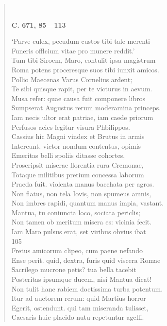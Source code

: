 \documentclass[11pt, a4paper]{report}
\begin{document}
\begin{verse}
        ﻿\pagebreak 
     \marginpar{[144]} \begin{center} \textbf{C. 671, 85—113} \end{center}‘Parve culex, pecudum custos tibi tale merenti \\ Funeris offlcium vitae pro munere reddit.’ \\ Tum tibi Siroem, Maro, contulit ipsa magistrum \\ Roma potens proceresque suos tibi iunxit amicos. \\ Pollio Maecenas Varus Cornelius ardent; \\ Te sibi quisque rapit, per te victurus in aevum. \\ Musa refer: quae causa fuit componere libros \\ Sumpserat Augustus rerum moderamina princeps. \\ Iam necis ultor erat patriae, iam caede priorum \\ Perfusos acies legitur visura Phbilippos. \\ Cassius hic Magni vindex et Brutus in armis \\ Intereunt. victor nondum contentus, opimis \\ Emeritas belli spoliis ditasse cohortes, \\ Proscripsit miserae florentia rura Cremonae, \\ Totaque militibus pretium concessa laborum \\ Praeda fuit. violenta manus bacchata per agros. \\ Non flatus, non tela Iovis, non spumeus amnis, \\ Non imbres rapidi, quantum manus impia, vastant. \\ Mantua, tu coniuncta loco, sociata periclis; \\ Non tamen ob meritum misera  \lbrack es: vicinia fecit. \\ Iam Maro pulsus erat, set viribus obvius ibat \\ 105 \\ Fretus amicorum clipeo, cum paene nefando \\ Ense perit. quid, dextra, furis quid viscera Romae \\ Sacrilego mucrone petis? tua bella tacebit \\ Posteritas ipsumque ducem, nisi Mantua dicat! \\ Non tulit hanc rabiem doctissima turba potentum. \\ Itur ad auctorem rerum: quid Martius horror \\ Egerit, ostendunt. qui tam miseranda tulisset, \\ Caesaris huic placido nutu repetuntur agelli. \\ 

\end{verse}
\end{document}
